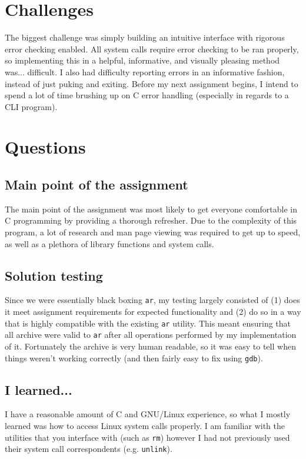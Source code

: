 \documentclass[letterpaper,10pt,titlepage]{article}
\begin{document}
\section{Challenges}
The biggest challenge was simply building an intuitive interface with rigorous error
checking enabled. All system calls require error checking to be ran properly, so
implementing this in a helpful, informative, and visually pleasing method was... difficult.
I also had difficulty reporting errors in an informative fashion, instead of just puking
and exiting. Before my next assignment begins, I intend to spend a lot of time brushing
up on C error handling (especially in regards to a CLI program).

\section{Questions}
\subsection{Main point of the assignment} 
The main point of the assignment was most likely to get everyone comfortable in C
programming by providing a thorough refresher. Due to the complexity of this program,
a lot of research and man page viewing was required to get up to speed, as well as
a plethora of library functions and system calls.

\subsection{Solution testing}
Since we were essentially black boxing \verb~ar~, my testing largely consisted of
(1) does it meet assignment requirements for expected functionality and (2) do
so in a way that is highly compatible with the existing \verb~ar~ utility. This meant
ensuring that all archive were valid to \verb~ar~ after all operations performed by
my implementation of it. Fortunately the archive is very human readable, so it
was easy to tell when things weren't working correctly (and then fairly easy to fix
using \verb~gdb~).

\subsection{I learned...}
I have a reasonable amount of C and GNU/Linux experience, so what I mostly learned
was how to access Linux system calls properly. I am familiar with the utilities
that you interface with (such as \verb~rm~) however I had not previously used
their system call correspondents (e.g. \verb~unlink~).
\end{document}
